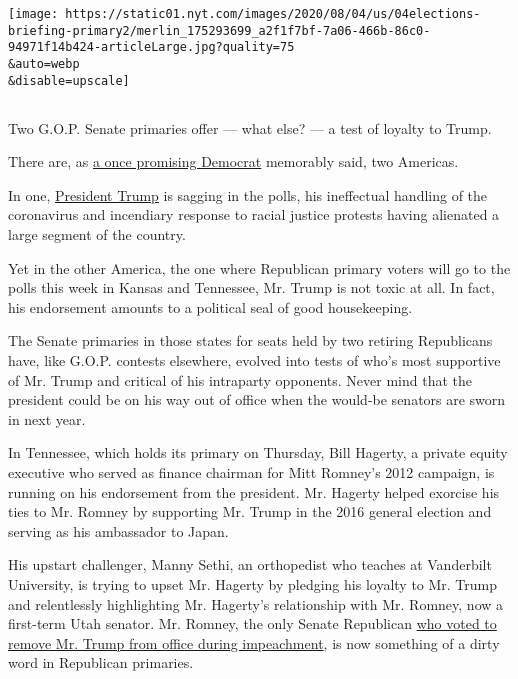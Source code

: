 \texttt{[image: https://static01.nyt.com/images/2020/08/04/us/04elections-briefing-primary2/merlin\_175293699\_a2f1f7bf-7a06-466b-86c0-94971f14b424-articleLarge.jpg?quality=75\\\&auto=webp\\\&disable=upscale]}

\subsection{}

Two G.O.P. Senate primaries offer --- what else? --- a test of loyalty
to Trump.

There are, as
\href{https://www.nytimes.com/2004/07/27/politics/campaign/senator-john-edwardss-remarks-to-the-democratic-national.html}{a
once promising Democrat} memorably said, two Americas.

In one,
\href{https://www.nytimes.com/interactive/2020/us/elections/donald-trump.html}{President
Trump} is sagging in the polls, his ineffectual handling of the
coronavirus and incendiary response to racial justice protests having
alienated a large segment of the country.

Yet in the other America, the one where Republican primary voters will
go to the polls this week in Kansas and Tennessee, Mr. Trump is not
toxic at all. In fact, his endorsement amounts to a political seal of
good housekeeping.

The Senate primaries in those states for seats held by two retiring
Republicans have, like G.O.P. contests elsewhere, evolved into tests of
who's most supportive of Mr. Trump and critical of his intraparty
opponents. Never mind that the president could be on his way out of
office when the would-be senators are sworn in next year.

In Tennessee, which holds its primary on Thursday, Bill Hagerty, a
private equity executive who served as finance chairman for Mitt
Romney's 2012 campaign, is running on his endorsement from the
president. Mr. Hagerty helped exorcise his ties to Mr. Romney by
supporting Mr. Trump in the 2016 general election and serving as his
ambassador to Japan.

His upstart challenger, Manny Sethi, an orthopedist who teaches at
Vanderbilt University, is trying to upset Mr. Hagerty by pledging his
loyalty to Mr. Trump and relentlessly highlighting Mr. Hagerty's
relationship with Mr. Romney, now a first-term Utah senator. Mr. Romney,
the only Senate Republican
\href{https://www.nytimes.com/2020/02/05/us/politics/romney-trump-impeachment.html}{who
voted to remove Mr. Trump from office during impeachment}, is now
something of a dirty word in Republican primaries.

